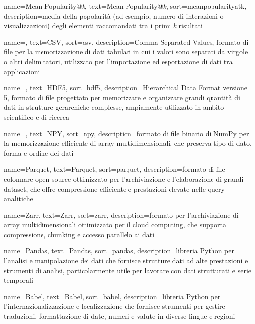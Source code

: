  {
    name=Mean Popularity@\emph{k},
    text=Mean Popularity@\emph{k},
    sort=meanpopularityatk,
    description={media della popolarità (ad esempio, numero di interazioni o visualizzazioni) degli elementi raccomandati tra i primi \emph{k} risultati}
}

 {
    name=,
    text=CSV,
    sort=csv,
    description={Comma-Separated Values, formato di file per la memorizzazione di dati tabulari in cui i valori sono separati da virgole o altri delimitatori, utilizzato per l'importazione ed esportazione di dati tra applicazioni}
}

 {
    name=,
    text=HDF5,
    sort=hdf5,
    description={Hierarchical Data Format versione 5, formato di file progettato per memorizzare e organizzare grandi quantità di dati in strutture gerarchiche complesse, ampiamente utilizzato in ambito scientifico e di ricerca}
}

 {
    name=,
    text=NPY,
    sort=npy,
    description={formato di file binario di NumPy per la memorizzazione efficiente di array multidimensionali, che preserva tipo di dato, forma e ordine dei dati}
}

 {
    name=Parquet,
    text=Parquet,
    sort=parquet,
    description={formato di file colonnare open-source ottimizzato per l'archiviazione e l'elaborazione di grandi dataset, che offre compressione efficiente e prestazioni elevate nelle query analitiche}
}

 {
    name=Zarr,
    text=Zarr,
    sort=zarr,
    description={formato per l'archiviazione di array multidimensionali ottimizzato per il cloud computing, che supporta compressione, chunking e accesso parallelo ai dati}
}

 {
    name=Pandas,
    text=Pandas,
    sort=pandas,
    description={libreria Python per l'analisi e manipolazione dei dati che fornisce strutture dati ad alte prestazioni e strumenti di analisi, particolarmente utile per lavorare con dati strutturati e serie temporali}
}

 {
    name=Babel,
        text=Babel,
        sort=babel,
        description={libreria Python per l'internazionalizzazione e localizzazione che fornisce strumenti per gestire traduzioni, formattazione di date, numeri e valute in diverse lingue e regioni}
}

